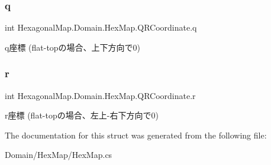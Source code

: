 \subsubsection{\texorpdfstring{q}{q}}
{\footnotesize\ttfamily int Hexagonal\+Map.\+Domain.\+Hex\+Map.\+Q\+R\+Coordinate.\+q\hspace{0.3cm}{\ttfamily [get]}}



q座標 (flat-\/topの場合、上下方向で0) 

\mbox{\label{struct_hexagonal_map_1_1_domain_1_1_hex_map_1_1_q_r_coordinate_a8e28e052a706b934419932f039c3b973}} 
\subsubsection{\texorpdfstring{r}{r}}
{\footnotesize\ttfamily int Hexagonal\+Map.\+Domain.\+Hex\+Map.\+Q\+R\+Coordinate.\+r\hspace{0.3cm}{\ttfamily [get]}}



r座標 (flat-\/topの場合、左上-\/右下方向で0) 



The documentation for this struct was generated from the following file\+:\begin{DoxyCompactItemize}
\item 
Domain/\+Hex\+Map/Hex\+Map.\+cs\end{DoxyCompactItemize}
